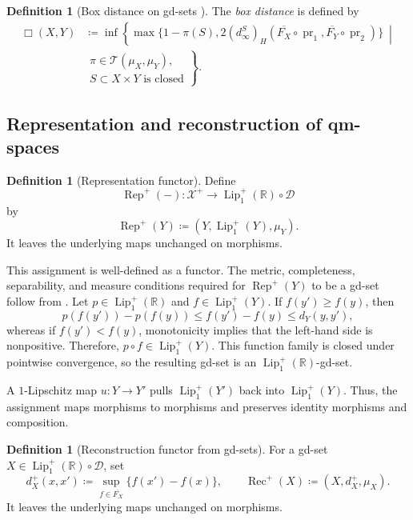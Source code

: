 \documentclass{amsart}
\theoremstyle{plain}
\theoremstyle{definition}
\newtheorem{definition}[theorem]{Definition}
\theoremstyle{remark}
\newcommand{\R}{\mathbb{R}}
\newcommand{\D}{\mathcal{D}}
\newcommand{\Xp}{\mathcal{X}^{+}}
\newcommand{\Lup}{\operatorname{Lip}^{+}_{1}(\R)}
\newcommand{\lipplus}{\operatorname{Lip}^{+}_{1}}
\DeclareMathOperator{\pr}{pr}
\newcommand{\dinf}[1]{d^{#1}_{\infty}}
\newcommand{\haus}[1]{\left(#1\right)_H}
\newcommand{\Tplan}{\mathcal{T}}
\begin{document}
\begin{definition}[Box distance on gd-sets {\cite[Definition~5.7, Lemma~5.12, and Theorem~5.14]{gds1}}]
\label{def:gds-box-distance}
The \emph{box distance} is defined by
\begin{equation}
\label{eq:gds-box}
\begin{aligned}
\Box(X,Y)&\coloneqq\inf\left\{\max\{1-\pi(S),2\haus{\dinf{S}}(\overline{F_X}\circ\pr_1,\overline{F_Y}\circ\pr_2)\}\ \middle|\right.\\
&\left.\begin{array}{l}
\pi\in\Tplan(\mu_X,\mu_Y),\\
S\subset X\times Y\text{ is closed}
\end{array}\right\}.
\end{aligned}
\end{equation}
\end{definition}

\subsection{Representation and reconstruction of qm-spaces}
\label{sec:adjunctions}

\begin{definition}[Representation functor]
\label{def:space-to-gds}
Define
\[\operatorname{Rep}^{+}(-)\colon\Xp\longrightarrow\Lup\circ\D\]
by
\[\operatorname{Rep}^{+}(Y)\coloneqq(Y,\lipplus(Y),\mu_Y).\]
It leaves the underlying maps unchanged on morphisms.
\end{definition}

This assignment is well-defined as a functor. The metric, completeness, separability, and measure conditions required for $\operatorname{Rep}^{+}(Y)$ to be a gd-set follow from . Let $p\in\Lup$ and $f\in\lipplus(Y)$. If $f(y')\geq f(y)$, then
\[p(f(y'))-p(f(y))\leq f(y')-f(y)\leq d_Y(y,y'),\]
whereas if $f(y')<f(y)$, monotonicity implies that the left-hand side is nonpositive. Therefore, $p\circ f\in\lipplus(Y)$. This function family is closed under pointwise convergence, so the resulting gd-set is an $\Lup$-gd-set.

A $1$-Lipschitz map $u\colon Y\to Y'$ pulls $\lipplus(Y')$ back into $\lipplus(Y)$. Thus, the assignment maps morphisms to morphisms and preserves identity morphisms and composition.

\begin{definition}[Reconstruction functor from gd-sets]
\label{def:gds-to-space}
For a gd-set $X\in\Lup\circ\D$, set
\[
d_X^+(x,x')\coloneqq\sup_{f\in\overline{F_X}}\{f(x')-f(x)\},\qquad
\operatorname{Rec}^{+}(X)\coloneqq(X,d_X^+,\mu_X).
\]
It leaves the underlying maps unchanged on morphisms.
\end{definition}
\end{document}
